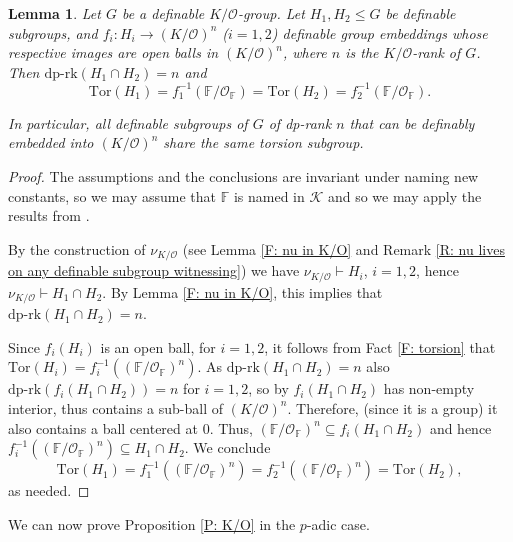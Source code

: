 \documentclass[11pt]{amsart}
\newtheorem{lemma}[theorem]{Lemma}
\theoremstyle{definition}
\newcommand{\CK}{{\mathcal K}}
\newcommand{\CO}{{\mathcal O}}
\newcommand{\0}{\emptyset}
\def\dpr{\mathrm{dp\text{-}rk}}
\def\sub{\subseteq}
\begin{document}
\begin{lemma}\label{L:full subgroups have the same torsion}
Let $G$ be a definable $K/\CO$-group. Let $H_1, H_2\leq G$ be definable subgroups, and  $f_i:H_i\to (K/\CO)^n$ ($i=1,2$) definable group embeddings whose respective images are  open balls  in $(K/\CO)^n$, where $n$ is the $K/\CO$-rank of $G$. Then  $\dpr(H_1\cap H_2)=n$ and $$\mathrm{Tor}(H_1)=f_1^{-1}(\mathbb{F}/\mathcal{O}_{\mathbb{F}})=\mathrm{Tor}(H_2)=f_2^{-1}(\mathbb{F}/\mathcal{O}_{\mathbb{F}}).$$ 

In particular, all definable subgroups of $G$ of dp-rank $n$ that can be definably embedded into  $(K/\CO)^n$  share the same torsion subgroup.
\end{lemma}
\begin{proof}
The assumptions and the conclusions are invariant under naming new constants, so we may assume that $\mathbb{F}$ is named in $\CK$ and so we may apply the results from \cite{HaHaPeGps}.

By the construction of $\nu_{K/\CO}$ (see Lemma \ref{F: nu in K/O} and Remark \ref{R: nu lives on any definable subgroup witnessing}) we have $\nu_{K/\CO}\vdash H_i$, $i=1,2$, hence    $\nu_{K/\CO}\vdash H_1\cap H_2$. By Lemma \ref{F: nu in K/O}, this implies that $\dpr(H_1\cap H_2)=n$. 

 Since $f_i(H_i)$ is an open ball, for $i=1,2$, it follows from  Fact \ref{F: torsion} that $\mathrm{Tor}(H_i)=f_i^{-1}((\mathbb{F}/\CO_{\mathbb{F}})^n)$. As $\dpr(H_1\cap H_2)=n$ also $\dpr(f_i(H_1\cap H_2))=n$ for $i=1,2$, so  by  \cite[Lemma 3.6]{HaHaPeGps} $f_i(H_1\cap H_2)$ has non-empty interior, thus contains a sub-ball of $(K/\CO)^n$. Therefore, (since it is a group) it also contains a ball centered at $0$. Thus, $(\mathbb F/\CO_{\mathbb F})^n\sub f_i(H_1\cap H_2)$ and hence $f_i^{-1}((\mathbb F/\CO_{\mathbb F})^n)\sub H_1\cap H_2$. We conclude \[\mathrm{Tor}(H_1)=f_1^{-1}((\mathbb F/\CO_{\mathbb F})^n)=f_2^{-1}((\mathbb F/\CO_{\mathbb F})^n)=\mathrm{Tor}(H_2),\] as needed.
\end{proof}

We can now prove Proposition \ref{P: K/O} in the $p$-adic case.
\end{document}
